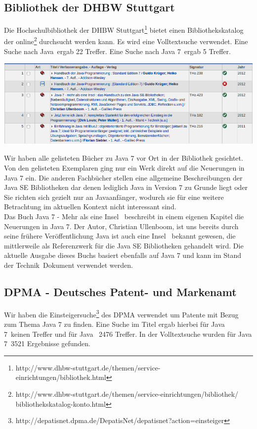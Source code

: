 \label{startdetails}
\subsection{Bibliothek der DHBW Stuttgart}
Die Hochschulbibliothek der DHBW Stuttgart\footnote{http://www.dhbw-stuttgart.de/themen/service-einrichtungen/bibliothek.html} bietet einen Bibliothekskatalog der online\footnote{http://www.dhbw-stuttgart.de/themen/service-einrichtungen/bibliothek/\\bibliothekskatalog-konto.html} durchsucht werden kann. Es wird eine Volltextsuche verwendet. Eine Suche nach \glqq Java\grqq ~ergab 22 Treffer. Eine Suche nach \glqq Java 7\grqq ~ergab 5 Treffer.

\begin{center}
\includegraphics[width=\textwidth]{images/dhbw-lib-search-results.png}
\end{center}

Wir haben alle gelisteten Bücher zu Java 7 vor Ort in der Bibliothek gesichtet. Von den gelisteten Exemplaren ging nur ein Werk\cite{javainsel2} direkt auf die Neuerungen in Java 7 ein. Die anderen Fachbücher stellen eine allgemeine Beschreibungen der Java SE Bibliotheken dar denen lediglich Java in Version 7 zu Grunde liegt\cite{dhLibHandbuchJava} oder Sie richten sich gezielt nur an Javaanfänger\cite{dhLibJetztJavaLernen}\cite{dhLibBlueJStart}, wodurch sie für eine weitere Betrachtung im aktuellen Kontext nicht interessant sind.\\

Das Buch \glqq Java 7 - Mehr als eine Insel\grqq\cite{javainsel2} ~beschreibt in einem eigenen Kapitel die Neuerungen in Java 7. Der Autor, Christian Ullenboom, ist uns bereits durch seine frühere Veröffentlichung \glqq Java ist auch eine Insel\grqq\cite{javainsel1} ~bekannt gewesen, die mittlerweile als Referenzwerk für die Java SE Bibliotheken gehandelt wird. Die aktuelle Ausgabe dieses Buchs basiert ebenfalls auf Java 7 und kann im \glqq Stand der Technik\grqq ~Dokument verwendet werden.

\subsection{DPMA - Deutsches Patent- und Markenamt}
Wir haben die Einsteigersuche\footnote{http://depatisnet.dpma.de/DepatisNet/depatisnet?action=einsteiger} des DPMA verwendet um Patente mit Bezug zum Thema Java 7 zu finden. Eine Suche im Titel ergab hierbei für \glqq Java 7\grqq ~keinen Treffer und für \glqq Java \grqq ~2476 Treffer. In der Volltextsuche wurden für \glqq Java 7\grqq ~3521 Ergebnisse gefunden.\\

